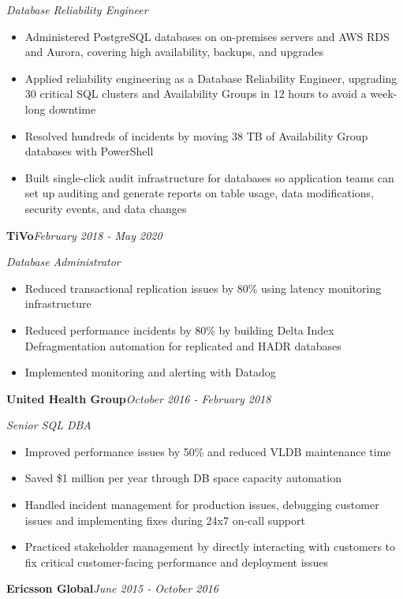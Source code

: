 \documentclass[10pt,a4paper]{article}
\begin{document}
\textit{Database Reliability Engineer}\\[-5pt]
\begin{itemize}
  \item Administered PostgreSQL databases on on-premises servers and AWS RDS and Aurora, covering high availability, backups, and upgrades
  \item Applied reliability engineering as a Database Reliability Engineer, upgrading 30 critical SQL clusters and Availability Groups in 12 hours to avoid a week-long downtime
  \item Resolved hundreds of incidents by moving 38 TB of Availability Group databases with PowerShell
  \item Built single-click audit infrastructure for databases so application teams can set up auditing and generate reports on table usage, data modifications, security events, and data changes
\end{itemize}
\vspace{14.7pt}
\noindent\textbf{TiVo}\hfill \textit{February 2018 - May 2020}

\textit{Database Administrator}\\[-5pt]
\begin{itemize}
  \item Reduced transactional replication issues by 80\% using latency monitoring infrastructure
  \item Reduced performance incidents by 80\% by building Delta Index Defragmentation automation for replicated and HADR databases
  \item Implemented monitoring and alerting with Datadog
\end{itemize}
\vspace{14.7pt}
\noindent\textbf{United Health Group}\hfill \textit{October 2016 - February 2018}

\textit{Senior SQL DBA}\\[-5pt]
\begin{itemize}
  \item Improved performance issues by 50\% and reduced VLDB maintenance time
  \item Saved \$1 million per year through DB space capacity automation
  \item Handled incident management for production issues, debugging customer issues and implementing fixes during 24x7 on-call support
  \item Practiced stakeholder management by directly interacting with customers to fix critical customer-facing performance and deployment issues
\end{itemize}
\vspace{14.7pt}
\noindent\textbf{Ericsson Global}\hfill \textit{June 2015 - October 2016}
\end{document}
